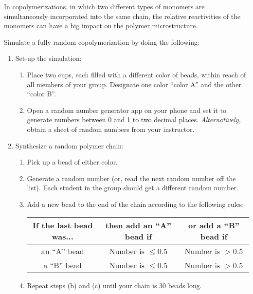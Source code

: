 \begin{activity}[Copolymerization]
\begin{instructornotes}
\end{instructornotes}


\begin{model}
	\label{\labelbase:mdl:simulation}

	In copolymerizations, in which two different types of monomers are simultaneously incorporated into the same chain, the relative reactivities of the monomers can have a big impact on the polymer microstructure.
	
	Simulate a fully random copolymerization by doing the following:
	
	\begin{enumerate}
		\item Set-up the simulation:
			\begin{enumerate}
				\item Place two cups, each filled with a different color of beads, within reach of all members of your group.  Designate one color ``color A'' and the other ``color B''.
				\item Open a random number generator app on your phone and set it to generate numbers between 0 and 1 to two decimal places.  \emph{Alternatively,} obtain a sheet of random numbers from your instructor.
			\end{enumerate}
		\item Synthesize a random polymer chain:
			\begin{enumerate}
				\item Pick up a bead of either color.
				\item Generate a random number (or, read the next random number off the list).  Each student in the group should get a different random number.
				\item Add a new bead to the end of the chain according to the following rules:
					\begin{center}
					\renewcommand{\arraystretch}{1.5}
					\begin{tabular}{|c|c|c|}
						\hline
						\textbf{If the last bead was...} &  \textbf{then add an ``A'' bead if} & \textbf{or add a ``B'' bead if}\\\hline
						 an ``A'' bead & Number is $\leq 0.5$ & Number is $> 0.5$ \\
						 a ``B'' bead & Number is $\leq 0.5$ & Number is $> 0.5$ \\\hline
					\end{tabular}
					\end{center}
				\item Repeat steps (b) and (c) until your chain is 30 beads long.
			\end{enumerate}
	\end{enumerate}
	

\end{model}
\end{activity}

